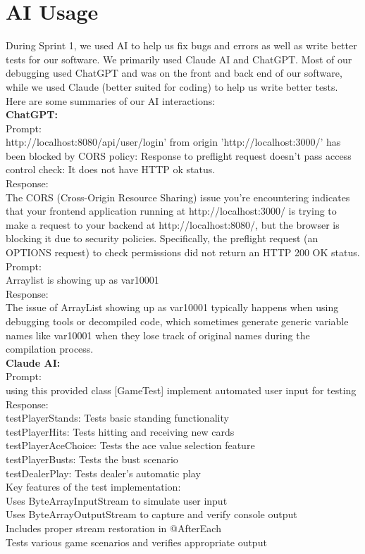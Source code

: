 \section{AI Usage}
\setlength{\parindent}{0pt}
During Sprint 1, we used AI to help us fix bugs and errors as well as write better tests for our software. We primarily used Claude AI and ChatGPT. Most of our debugging used ChatGPT and was on the front and back end of our software, while we used Claude (better suited for coding) to help us write better tests.\\

Here are some summaries of our AI interactions:\\

\textbf{ChatGPT:}\\

Prompt:\\
http://localhost:8080/api/user/login' from origin 'http://localhost:3000/' has been blocked by CORS policy: Response to preflight request doesn't pass access control check: It does not have HTTP ok status.\\

Response:\\
The CORS (Cross-Origin Resource Sharing) issue you’re encountering indicates that your frontend application running at http://localhost:3000/ is trying to make a request to your backend at http://localhost:8080/, but the browser is blocking it due to security policies. Specifically, the preflight request (an OPTIONS request) to check permissions did not return an HTTP 200 OK status. \\

Prompt:\\
Arraylist is showing up as var10001\\

Response:\\
The issue of ArrayList showing up as var10001 typically happens when using debugging tools or decompiled code, which sometimes generate generic variable names like var10001 when they lose track of original names during the compilation process.\\

\textbf{Claude AI:}\\

Prompt:\\
using this provided class [GameTest] implement automated user input for testing\\

Response:\\
testPlayerStands: Tests basic standing functionality\\
testPlayerHits: Tests hitting and receiving new cards\\
testPlayerAceChoice: Tests the ace value selection feature\\
testPlayerBusts: Tests the bust scenario\\
testDealerPlay: Tests dealer's automatic play\\

Key features of the test implementation:\\

Uses ByteArrayInputStream to simulate user input\\
Uses ByteArrayOutputStream to capture and verify console output\\
Includes proper stream restoration in @AfterEach\\
Tests various game scenarios and verifies appropriate output\\
